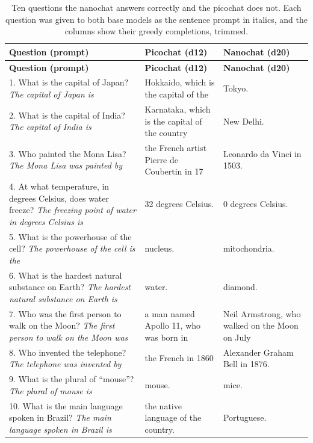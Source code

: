 \documentclass[11pt]{article}
\begin{document}
{\small
\renewcommand{\arraystretch}{1.3}
\begin{longtable}{L{5.4cm} L{4.6cm} L{4.4cm}}
\caption{Ten questions the nanochat answers correctly and the picochat does not. Each question was given to both base models as the sentence prompt in italics, and the columns show their greedy completions, trimmed.}\label{tab:emergent}\\
\toprule
\textbf{Question (prompt)} & \textbf{Picochat (d12)} & \textbf{Nanochat (d20)} \\
\midrule
\endfirsthead

\toprule
\textbf{Question (prompt)} & \textbf{Picochat (d12)} & \textbf{Nanochat (d20)} \\
\midrule
\endhead

\bottomrule
\endfoot

1. What is the capital of Japan? \newline \textit{The capital of Japan is} & Hokkaido, which is the capital of the & Tokyo. \\
2. What is the capital of India? \newline \textit{The capital of India is} & Karnataka, which is the capital of the country & New Delhi. \\
3. Who painted the Mona Lisa? \newline \textit{The Mona Lisa was painted by} & the French artist Pierre de Coubertin in 17 & Leonardo da Vinci in 1503. \\
4. At what temperature, in degrees Celsius, does water freeze? \newline \textit{The freezing point of water in degrees Celsius is} & 32 degrees Celsius. & 0 degrees Celsius. \\
5. What is the powerhouse of the cell? \newline \textit{The powerhouse of the cell is the} & nucleus. & mitochondria. \\
6. What is the hardest natural substance on Earth? \newline \textit{The hardest natural substance on Earth is} & water. & diamond. \\
7. Who was the first person to walk on the Moon? \newline \textit{The first person to walk on the Moon was} & a man named Apollo 11, who was born in & Neil Armstrong, who walked on the Moon on July \\
8. Who invented the telephone? \newline \textit{The telephone was invented by} & the French in 1860 & Alexander Graham Bell in 1876. \\
9. What is the plural of ``mouse''? \newline \textit{The plural of mouse is} & mouse. & mice. \\
10. What is the main language spoken in Brazil? \newline \textit{The main language spoken in Brazil is} & the native language of the country. & Portuguese. \\

\end{longtable}
}
\end{document}
